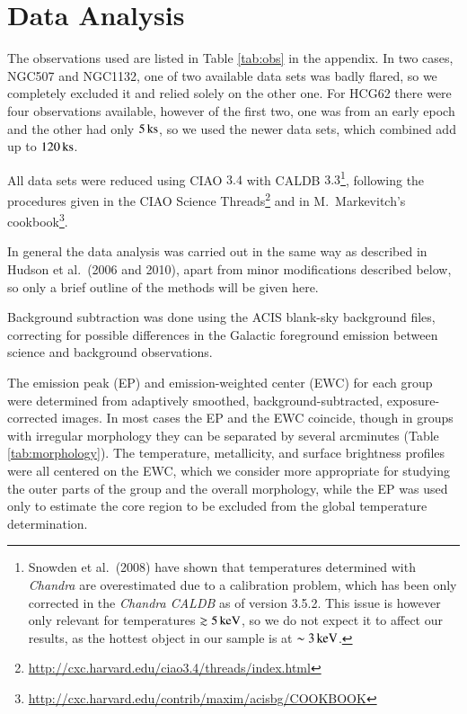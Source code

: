 \documentclass[structabstract]{aa}
\begin{document}
%
%
%
\section{Data Analysis}\label{sec:analysis}
The observations used are listed in Table \ref{tab:obs} in the
appendix. In two cases, NGC507 and NGC1132, one of two available data
sets was badly flared, so we completely excluded it and relied solely
on the other one. For HCG62 there were four observations available,
however of the first two, one was from an early epoch and the other
had only $\unit[5]{ks}$, so we used the newer data sets, which
combined add up to $\unit[120]{ks}$.

All data sets were reduced using CIAO $3.4$ with CALDB $3.3$\footnote{ Snowden et
al.\ (2008) have shown that temperatures determined with
\emph{Chandra} are overestimated due to a calibration problem, which has been
only corrected in the \emph{Chandra CALDB} as of version 3.5.2. This issue is
however only relevant for temperatures $\gtrsim \unit[5]{keV}$, so we
do not expect it to affect our results, as the hottest object in our sample is
at $\sim \unit[3]{keV}$.}, following the
procedures given in the CIAO Science
Threads\footnote{\url{http://cxc.harvard.edu/ciao3.4/threads/index.html}} and
in M.\ Markevitch's
cookbook\footnote{\url{http://cxc.harvard.edu/contrib/maxim/acisbg/COOKBOOK}}.

In general the data analysis was carried out in the same way as described in
Hudson et al.\ (2006 and 2010), apart from minor modifications described below,
so only a brief outline of the methods will be given here.

Background subtraction was done using the ACIS blank-sky background files,
correcting for possible differences in the Galactic foreground emission
between science and background observations.

The emission peak (EP) and emission-weighted center (EWC) for each group were
determined from adaptively smoothed, background-subtracted, exposure-corrected
images. In most cases the EP and the EWC coincide, though in groups with
irregular morphology they can be separated by several arcminutes
(Table \ref{tab:morphology}). The temperature, metallicity, and
surface brightness profiles were all centered on the EWC, which we consider
more appropriate for studying the outer parts of the group and the overall
morphology, while the EP was used only to estimate the core region to be
excluded from the global temperature determination.
%
\end{document}

